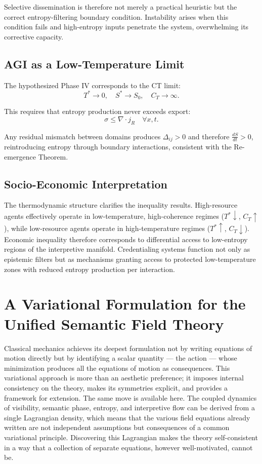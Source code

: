 \documentclass[12pt,a4paper]{article}
\begin{document}
Selective dissemination is therefore not merely a practical heuristic but the correct entropy-filtering boundary condition. Instability arises when this condition fails and high-entropy inputs penetrate the system, overwhelming its corrective capacity.

\subsection{AGI as a Low-Temperature Limit}

The hypothesized Phase IV corresponds to the CT limit:
\[
T^* \to 0, \quad S^* \to S_0, \quad C_T \to \infty.
\]

This requires that entropy production never exceeds export:
\[
\sigma \leq \nabla \cdot j_R \quad \forall x,t.
\]

Any residual mismatch between domains produces $\Delta_{ij} > 0$ and therefore $\frac{dS}{dt} > 0$, reintroducing entropy through boundary interactions, consistent with the Re-emergence Theorem.

\subsection{Socio-Economic Interpretation}

The thermodynamic structure clarifies the inequality results. High-resource agents effectively operate in low-temperature, high-coherence regimes ($T^* \downarrow$, $C_T \uparrow$), while low-resource agents operate in high-temperature regimes ($T^* \uparrow$, $C_T \downarrow$). Economic inequality therefore corresponds to differential access to low-entropy regions of the interpretive manifold. Credentialing systems function not only as epistemic filters but as mechanisms granting access to protected low-temperature zones with reduced entropy production per interaction.

\section{A Variational Formulation for the Unified Semantic Field Theory}

Classical mechanics achieves its deepest formulation not by writing equations of motion directly but by identifying a scalar quantity — the action — whose minimization produces all the equations of motion as consequences. This variational approach is more than an aesthetic preference; it imposes internal consistency on the theory, makes its symmetries explicit, and provides a framework for extension. The same move is available here. The coupled dynamics of visibility, semantic phase, entropy, and interpretive flow can be derived from a single Lagrangian density, which means that the various field equations already written are not independent assumptions but consequences of a common variational principle. Discovering this Lagrangian makes the theory self-consistent in a way that a collection of separate equations, however well-motivated, cannot be.
\end{document}
